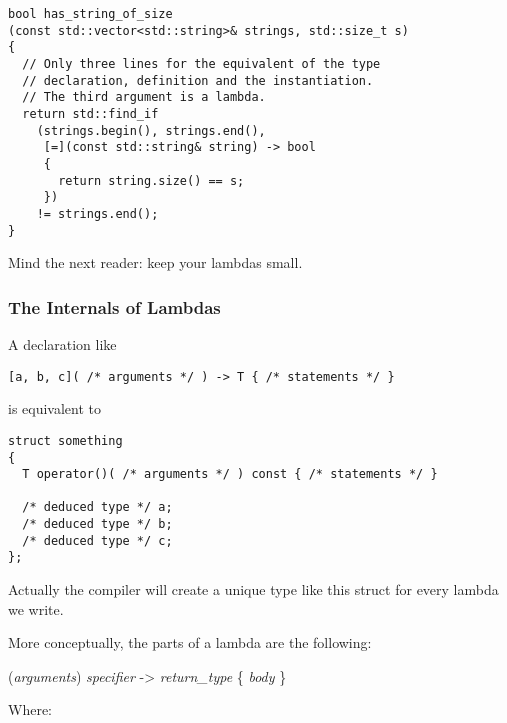 \begin{lstlisting}
bool has_string_of_size
(const std::vector<std::string>& strings, std::size_t s)
{
  // Only three lines for the equivalent of the type
  // declaration, definition and the instantiation.
  // The third argument is a lambda.
  return std::find_if
    (strings.begin(), strings.end(),
     [=](const std::string& string) -> bool
     {
       return string.size() == s;
     })
    != strings.end();
}
\end{lstlisting}

\begin{guideline}
  Mind the next reader: keep your lambdas small.
\end{guideline}

\subsubsection{The Internals of Lambdas}
\label{lambdas-internals}

A declaration like

\begin{lstlisting}
[a, b, c]( /* arguments */ ) -> T { /* statements */ }
\end{lstlisting}

is equivalent to

\begin{lstlisting}
struct something
{
  T operator()( /* arguments */ ) const { /* statements */ }

  /* deduced type */ a;
  /* deduced type */ b;
  /* deduced type */ c;
};
\end{lstlisting}

Actually the compiler will create a unique type like this struct for
every lambda we write.

More conceptually, the parts of a lambda are the following:

\bigskip

\indent [{\it capture}]({\it arguments}) {\it specifier} -\textgreater
        {\it return\_type} \{ {\it body} \}

\bigskip

Where:

